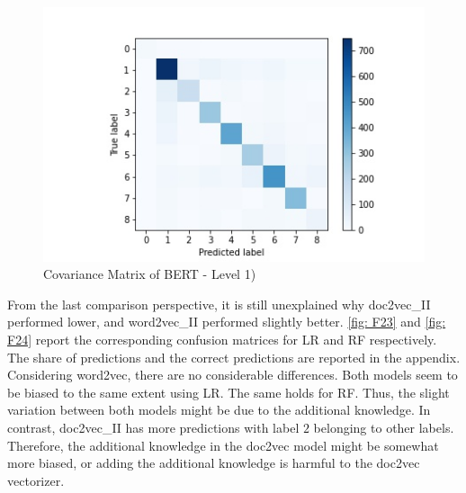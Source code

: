 \documentclass[12pt, a4paper, titlepage]{article}
\begin{document}
\begin{figure}[hb!]
  \center
  \includegraphics[scale=0.5]{cm_bert_clf_l1.jpg}
  \caption{\label{fig: F25} Covariance Matrix of BERT - Level 1)}
\end{figure}



From the last comparison perspective, it is still unexplained why doc2vec\_II performed lower, and word2vec\_II performed slightly better. \ref{fig: F23} and \ref{fig: F24} report the corresponding confusion matrices for \ac{LR} and \ac{RF} respectively. The share of predictions and the correct predictions are reported in the appendix. Considering word2vec, there are no considerable differences. Both models seem to be biased to the same extent using \ac{LR}. The same holds for \ac{RF}. Thus, the slight variation between both models might be due to the additional knowledge. In contrast, doc2vec\_II has more predictions with label $2$ belonging to other labels. Therefore, the additional knowledge in the doc2vec model might be somewhat more biased, or adding the additional knowledge is harmful to the doc2vec vectorizer. 
\end{document}
